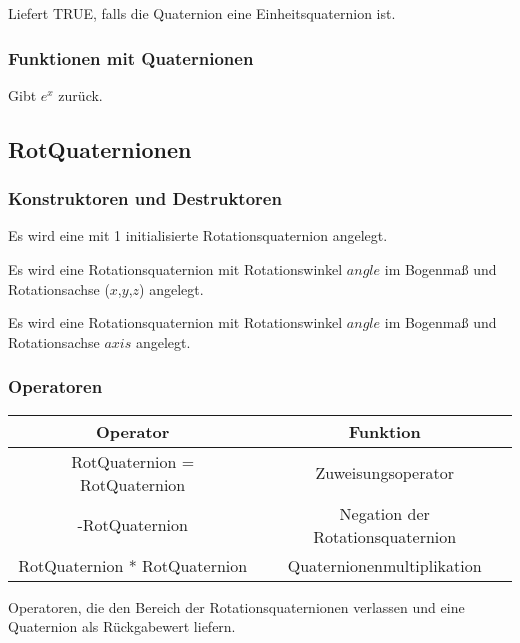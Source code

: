 \descr
{
Liefert TRUE, falls die Quaternion eine Einheitsquaternion ist.
}

\subsubsection{Funktionen mit Quaternionen}
\descr
{
Gibt $e^x$ zurück.
}
\subsection{RotQuaternionen}
\hypertarget{RotQuaternion}{}
\subsubsection{Konstruktoren und Destruktoren}
\descr
{
Es wird eine mit 1 initialisierte Rotationsquaternion angelegt.
}

\descr
{
Es wird eine Rotationsquaternion mit Rotationswinkel $angle$ im Bogenmaß und
Rotationsachse ($x$,$y$,$z$) angelegt.
}

\descr
{
Es wird eine Rotationsquaternion mit Rotationswinkel $angle$ im Bogenmaß und
Rotationsachse $axis$ angelegt.
}


\subsubsection{Operatoren}
\begin{tabular}{|c|c|}
\hline
Operator & Funktion\\ 
\hline
RotQuaternion = RotQuaternion & Zuweisungsoperator\\
\hline
-RotQuaternion & Negation der Rotationsquaternion\\
\hline
RotQuaternion * RotQuaternion & Quaternionenmultiplikation\\
\hline
\end{tabular}

Operatoren, die den Bereich der Rotationsquaternionen verlassen und eine Quaternion als
Rückgabewert liefern.


